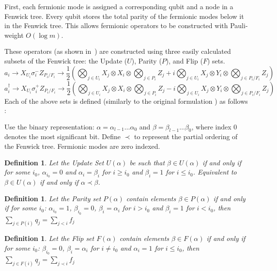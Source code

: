 \documentclass[pdftex,pra,aps,twocolumn,twoside]{revtex4-1}
\theoremstyle{plain}
\newtheorem{definition}[theorem]{Definition}
\theoremstyle{note}
\newcommand\+{{\footnotesize \raisebox{0.3ex}{+}}}
\begin{document}
First, each fermionic mode is assigned a corresponding qubit and a node in a Fenwick tree. Every qubit stores the total parity of the fermionic modes below it in the Fenwick tree. This allows fermionic operators to be constructed with Pauli-weight $O(\log m)$.

These operators (as shown in~\cite{seeley2012bravyi}) are constructed using three easily calculated subsets of the Fenwick tree: the Update ($U$), Parity ($P$), and Flip ($F$)  sets.
\begin{dmath*}
a_i \rightarrow X_{U_i}  \sigma^-_i  Z_{ P_i/F_i} \rightarrow \frac{1}{2}\left( \bigotimes_{j \in U_i} X_j \otimes X_i \otimes \bigotimes_{j \in P_i} Z_j + i \bigotimes_{j \in U_i} X_j \otimes Y_i\otimes \bigotimes_{j \in P_i/F_i} Z_j \right)
\end{dmath*}
\begin{dmath*}
a^{\dagger}_i \rightarrow X_{U_i}  \sigma^+_iZ_{ P_i/F_i} \rightarrow \frac{1}{2}\left( \bigotimes_{j \in U_i} X_j \otimes X_i \otimes \bigotimes_{j \in P_i} Z_j - i \bigotimes_{j \in U_i} X_j \otimes Y_i\otimes \bigotimes_{j \in  P_i/F_i} Z_j \right) 
\end{dmath*}
Each of the above sets is defined (similarly to the original formulation \cite{seeley2012bravyi}) as follows :

Use the binary representation: $\alpha = \alpha_{l-1}\ldots \alpha_0$ and $\beta = \beta_{l-1}\ldots \beta_0$, where index $0$ denotes the most significant bit. Define $\prec$ to represent the partial ordering of the Fenwick tree. Fermionic modes are zero indexed.

\begin{definition} Let the Update Set $U(\alpha)$ be such that $\beta \in U(\alpha)$ if and only if for some $i_0$, $\alpha_{i_0} = 0$ and $\alpha_i = \beta_i$ for $i\geq i_0$ and $\beta_i = 1$ for $i \leq i_0$. Equivalent to $\beta \in U(\alpha)$ if and only if $\alpha \prec \beta$.
\end{definition}

\begin{definition} Let the Parity set $P(\alpha)$ contain elements $\beta \in P(\alpha)$ if and only if for some $i_0$: $\alpha_{i_0} = 1$, $\beta_{i_0} = 0$, $\beta_i = \alpha_i$ for $i> i_0$ and $\beta_i = 1$ for $i< i_0$, then $
        \sum_{j \in P(i)} q_j = \sum_{j < i} f_j$
\end{definition}

\begin{definition} Let the Flip set $F(\alpha)$ contain elements $\beta \in F(\alpha)$ if and only if for some $i_0$: $\beta_{i_0} = 0$, $\beta_i = \alpha_i$ for $i\neq i_0$ and $\alpha_i = 1$ for $i\leq i_0$, then $
 \sum_{j \in F(i)} q_j = \sum_{j \prec i} f_j$
\end{definition}
\end{document}
